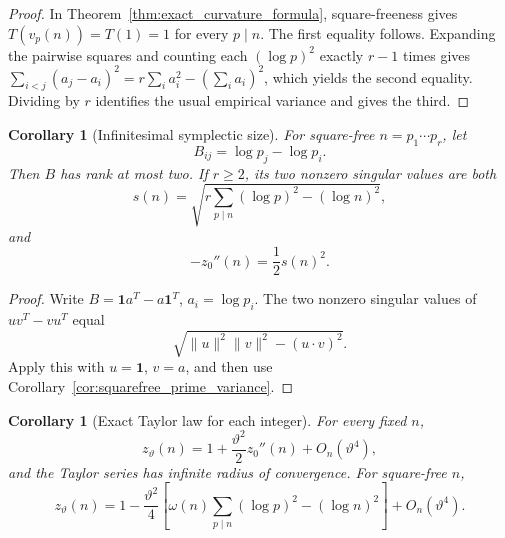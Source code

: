 \documentclass[11pt]{amsart}
\numberwithin{equation}{section}
\theoremstyle{plain}
\newtheorem{corollary}[theorem]{Corollary}
\theoremstyle{definition}
\theoremstyle{remark}
\begin{document}
\begin{proof}
In Theorem~\ref{thm:exact_curvature_formula}, square-freeness gives
\(T(v_p(n))=T(1)=1\) for every \(p\mid n\).  The first equality follows.
Expanding the pairwise squares and counting each \((\log p)^2\) exactly
\(r-1\) times gives
\(\sum_{i<j}(a_j-a_i)^2=r\sum_i a_i^2-(\sum_i a_i)^2\), which yields the
second equality.  Dividing by \(r\) identifies the usual empirical variance
and gives the third.
\end{proof}

\begin{corollary}[Infinitesimal symplectic size]
\label{cor:cohomological_singular_value}
For square-free \(n=p_1\cdots p_r\), let
\begin{equation}
B_{ij}=\log p_j-\log p_i.
\label{eq:B_matrix_logs}
\end{equation}
Then \(B\) has rank at most two. If \(r\ge2\), its two nonzero singular
values are both
\begin{equation}
s(n)=\sqrt{r\sum_{p\mid n}(\log p)^2-(\log n)^2},
\label{eq:singular_value_s}
\end{equation}
and
\begin{equation}
\boxed{-z_0''(n)=\frac12s(n)^2.}
\label{eq:curvature_singular_value}
\end{equation}
\end{corollary}

\begin{proof}
Write \(B=\mathbf1a^T-a\mathbf1^T\), \(a_i=\log p_i\). The two nonzero
singular values of \(uv^T-vu^T\) equal
\begin{equation}
\sqrt{\|u\|^2\|v\|^2-(u\cdot v)^2}.
\label{eq:wedge_singular_value}
\end{equation}
Apply this with \(u=\mathbf1\), \(v=a\), and then use
Corollary~\ref{cor:squarefree_prime_variance}.
\end{proof}

\begin{corollary}[Exact Taylor law for each integer]
\label{cor:coefficient_taylor_exact}
For every fixed \(n\),
\begin{equation}
z_\vartheta(n)=1+\frac{\vartheta^2}{2}z_0''(n)+O_n(\vartheta^4),
\label{eq:ztheta_general_taylor}
\end{equation}
and the Taylor series has infinite radius of convergence. For square-free
\(n\),
\begin{equation}
\boxed{
z_\vartheta(n)=1-\frac{\vartheta^2}{4}
\left[\omega(n)\sum_{p\mid n}(\log p)^2-(\log n)^2\right]
+O_n(\vartheta^4).}
\label{eq:ztheta_squarefree_taylor}
\end{equation}
\end{corollary}
\end{document}
